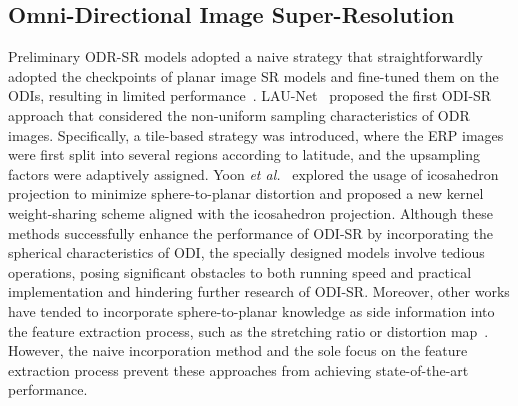 \subsection{Omni-Directional Image Super-Resolution}
Preliminary ODR-SR models adopted a naive strategy that straightforwardly adopted the checkpoints of planar image SR models and fine-tuned them on the ODIs, resulting in limited performance~\cite{ozcinar2019super}.
%
LAU-Net~\cite{deng2021lau} proposed the first ODI-SR approach that considered the non-uniform sampling characteristics of ODR images. Specifically, a tile-based strategy was introduced, where the ERP images were first split into several regions according to latitude, and the upsampling factors were adaptively assigned.
%
Yoon \textit{et al.}~\cite{yoon2022spheresr} explored the usage of icosahedron projection to minimize sphere-to-planar distortion and proposed a new kernel weight-sharing scheme aligned with the icosahedron projection.
%
Although these methods successfully enhance the performance of ODI-SR by incorporating the spherical characteristics of ODI, the specially designed models involve tedious operations, posing significant obstacles to both running speed and practical implementation and hindering further research of ODI-SR.
%
Moreover, other works have tended to incorporate sphere-to-planar knowledge as side information into the feature extraction process, such as the stretching ratio or distortion map~\cite{yu2023osrt}.
%
However, the naive incorporation method and the sole focus on the feature extraction process prevent these approaches from achieving state-of-the-art performance.
%

